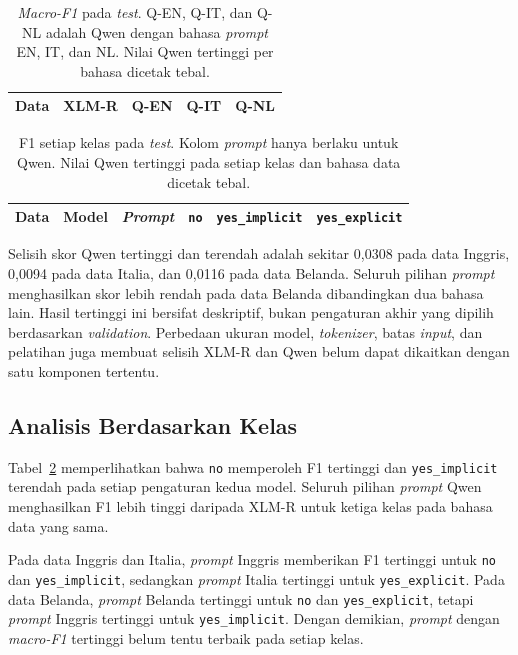 \documentclass[11pt]{article}
\begin{document}
\begin{table}[t]
\centering\small
\setlength{\tabcolsep}{2pt}
\begin{tabular}{lrrrr}
\toprule
Data & XLM-R & Q-EN & Q-IT & Q-NL \\
\midrule

\end{tabular}
\caption{\textit{Macro-F1} pada \textit{test}. Q-EN, Q-IT, dan Q-NL adalah Qwen dengan bahasa \textit{prompt} EN, IT, dan NL. Nilai Qwen tertinggi per bahasa dicetak tebal.}
\label{tab:main}
\end{table}

\begin{table}[t]
\centering\small
\begin{tabular}{lllrrr}
\toprule
Data & Model & \textit{Prompt} & \texttt{no} & \texttt{yes\_implicit} & \texttt{yes\_explicit} \\
\midrule

\end{tabular}
\caption{F1 setiap kelas pada \textit{test}. Kolom \textit{prompt} hanya berlaku untuk Qwen. Nilai Qwen tertinggi pada setiap kelas dan bahasa data dicetak tebal.}
\label{tab:classes}
\end{table}

Selisih skor Qwen tertinggi dan terendah adalah sekitar 0,0308 pada data Inggris, 0,0094 pada data Italia, dan 0,0116 pada data Belanda. Seluruh pilihan \textit{prompt} menghasilkan skor lebih rendah pada data Belanda dibandingkan dua bahasa lain. Hasil tertinggi ini bersifat deskriptif, bukan pengaturan akhir yang dipilih berdasarkan \textit{validation}. Perbedaan ukuran model, \textit{tokenizer}, batas \textit{input}, dan pelatihan juga membuat selisih XLM-R dan Qwen belum dapat dikaitkan dengan satu komponen tertentu.

\subsection{Analisis Berdasarkan Kelas}
Tabel~\ref{tab:classes} memperlihatkan bahwa \texttt{no} memperoleh F1 tertinggi dan \texttt{yes\_implicit} terendah pada setiap pengaturan kedua model. Seluruh pilihan \textit{prompt} Qwen menghasilkan F1 lebih tinggi daripada XLM-R untuk ketiga kelas pada bahasa data yang sama.



Pada data Inggris dan Italia, \textit{prompt} Inggris memberikan F1 tertinggi untuk \texttt{no} dan \nolinkurl{yes_implicit}, sedangkan \textit{prompt} Italia tertinggi untuk \nolinkurl{yes_explicit}. Pada data Belanda, \textit{prompt} Belanda tertinggi untuk \texttt{no} dan \nolinkurl{yes_explicit}, tetapi \textit{prompt} Inggris tertinggi untuk \nolinkurl{yes_implicit}. Dengan demikian, \textit{prompt} dengan \textit{macro-F1} tertinggi belum tentu terbaik pada setiap kelas.
\end{document}
